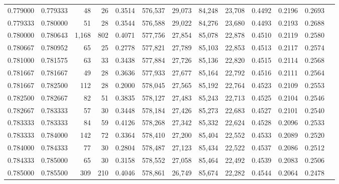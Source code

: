 \begin{tabular}{rrrrrrrrrrrrr}
0.779000 & 0.779333 &    48 &  26 &                                     0.3514 & 576,537 &  29,073 &  84,248 &  23,708 & 0.4492 & 0.2196 & 0.2693 \\
0.779333 & 0.780000 &    51 &  28 &                                     0.3544 & 576,588 &  29,022 &  84,276 &  23,680 & 0.4493 & 0.2193 & 0.2688 \\
0.780000 & 0.780643 & 1,168 & 802 &                                     0.4071 & 577,756 &  27,854 &  85,078 &  22,878 & 0.4510 & 0.2119 & 0.2580 \\
0.780667 & 0.780952 &    65 &  25 &                                     0.2778 & 577,821 &  27,789 &  85,103 &  22,853 & 0.4513 & 0.2117 & 0.2574 \\
0.781000 & 0.781575 &    63 &  33 &                                     0.3438 & 577,884 &  27,726 &  85,136 &  22,820 & 0.4515 & 0.2114 & 0.2568 \\
0.781667 & 0.781667 &    49 &  28 &                                     0.3636 & 577,933 &  27,677 &  85,164 &  22,792 & 0.4516 & 0.2111 & 0.2564 \\
0.781667 & 0.782500 &   112 &  28 &                                     0.2000 & 578,045 &  27,565 &  85,192 &  22,764 & 0.4523 & 0.2109 & 0.2553 \\
0.782500 & 0.782667 &    82 &  51 &                                     0.3835 & 578,127 &  27,483 &  85,243 &  22,713 & 0.4525 & 0.2104 & 0.2546 \\
0.782667 & 0.783333 &    57 &  30 &                                     0.3448 & 578,184 &  27,426 &  85,273 &  22,683 & 0.4527 & 0.2101 & 0.2540 \\
0.783333 & 0.783333 &    84 &  59 &                                     0.4126 & 578,268 &  27,342 &  85,332 &  22,624 & 0.4528 & 0.2096 & 0.2533 \\
0.783333 & 0.784000 &   142 &  72 &                                     0.3364 & 578,410 &  27,200 &  85,404 &  22,552 & 0.4533 & 0.2089 & 0.2520 \\
0.784000 & 0.784333 &    77 &  30 &                                     0.2804 & 578,487 &  27,123 &  85,434 &  22,522 & 0.4537 & 0.2086 & 0.2512 \\
0.784333 & 0.785000 &    65 &  30 &                                     0.3158 & 578,552 &  27,058 &  85,464 &  22,492 & 0.4539 & 0.2083 & 0.2506 \\
0.785000 & 0.785500 &   309 & 210 &                                     0.4046 & 578,861 &  26,749 &  85,674 &  22,282 & 0.4544 & 0.2064 & 0.2478 \\

\end{tabular}
